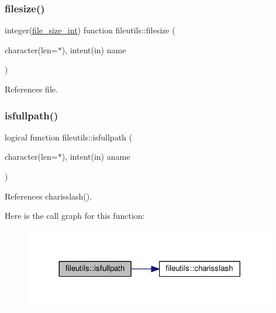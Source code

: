 \subsubsection{\texorpdfstring{filesize()}{filesize()}}
{\footnotesize\ttfamily integer(\mbox{\hyperlink{namespacefileutils_a334ae57c14956bd4597df7a130f6e8a8}{file\+\_\+size\+\_\+int}}) function fileutils\+::filesize (\begin{DoxyParamCaption}\item[{character(len=$\ast$), intent(in)}]{name }\end{DoxyParamCaption})\hspace{0.3cm}{\ttfamily [private]}}



References file.

\mbox{\label{namespacefileutils_a89b6c0a1ef1dc72e17a37f50a71a98ed}} 
\subsubsection{\texorpdfstring{isfullpath()}{isfullpath()}}
{\footnotesize\ttfamily logical function fileutils\+::isfullpath (\begin{DoxyParamCaption}\item[{character(len=$\ast$), intent(in)}]{aname }\end{DoxyParamCaption})\hspace{0.3cm}{\ttfamily [private]}}



References charisslash().

Here is the call graph for this function\+:
\nopagebreak
\begin{figure}[H]
\begin{center}
\leavevmode
\includegraphics[width=312pt]{namespacefileutils_a89b6c0a1ef1dc72e17a37f50a71a98ed_cgraph}
\end{center}
\end{figure}
\mbox{\label{namespacefileutils_ae3e1c820dd72fbdae478ed44d5cd065c}} 
